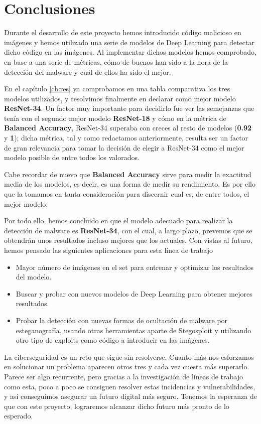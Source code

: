 \chapter{Conclusiones}
\label{ch:conc}

Durante el desarrollo de este proyecto hemos introducido código malicioso en imágenes y hemos utilizado una serie de modelos de Deep Learning para detectar dicho código en las imágenes. Al implementar dichos modelos hemos comprobado, en base a una serie de métricas, cómo de buenos han sido a la hora de la detección del malware y cuál de ellos ha sido el mejor.

En el capítulo \ref{ch:res} ya comprobamos en una tabla comparativa los tres modelos utilizados, y resolvimos finalmente en declarar como mejor modelo \textbf{ResNet-34}. Un factor muy importante para decidirlo fue ver las semejanzas que tenía con el segundo mejor modelo \textbf{ResNet-18} y cómo en la métrica de \textbf{Balanced Accuracy}, ResNet-34 superaba con creces al resto de modelos (\textbf{0.92} y \textbf{1}); dicha métrica, tal y como redactamos anteriormente, resulta ser un factor de gran relevancia para tomar la decisión de elegir a ResNet-34 como el mejor modelo posible de entre todos los valorados.

Cabe recordar de nuevo que \textbf{Balanced Accuracy} sirve para medir la exactitud media de los modelos, es decir, es una forma de medir su rendimiento. Es por ello que la tomamos en tanta consideración para discernir cual es, de entre todos, el mejor modelo.

Por todo ello, hemos concluido en que el modelo adecuado para realizar la detección de malware es \textbf{ResNet-34}, con el cual, a largo plazo, prevemos que se obtendrán unos resultados incluso mejores que los actuales. Con vistas al futuro, hemos pensado las siguientes aplicaciones para esta línea de trabajo

\begin{itemize}
\item Mayor número de imágenes en el set para entrenar y optimizar los resultados del modelo.
\item Buscar y probar con nuevos modelos de Deep Learning para obtener mejores resultados.
\item Probar la detección con nuevas formas de ocultación de malware por esteganografía, usando otras herramientas aparte de Stegosploit y utilizando otro tipo de exploits como código a introducir en las imágenes.
\end{itemize}

La ciberseguridad es un reto que sigue sin resolverse. Cuanto más nos esforzamos en solucionar un problema aparecen otros tres y cada vez cuesta más superarlo. Parece ser algo recurrente, pero gracias a la investigación de líneas de trabajo como esta, poco a poco se consiguen resolver estas incidencias y vulnerabilidades, y así conseguimos asegurar un futuro digital más seguro. Tenemos la esperanza de que con este proyecto, lograremos alcanzar dicho futuro más pronto de lo esperado.
